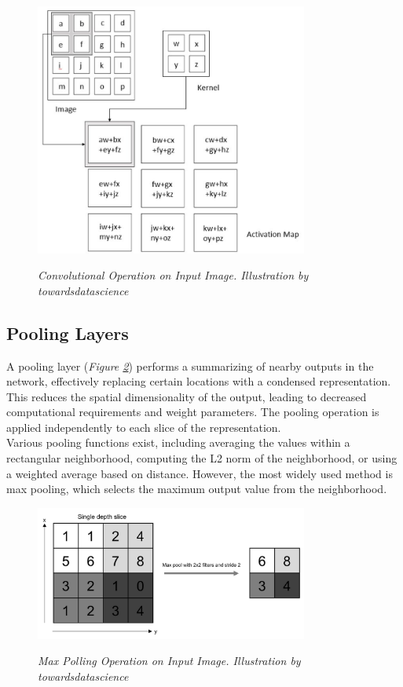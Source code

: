 \begin{figure}[H]
\centering
\includegraphics[width=0.8\textwidth]{imatges/preliminaries/convolutional-layer.png}
\caption[Convolutional Operation on Input Image]{\textit{Convolutional Operation on Input Image. Illustration by towardsdatascience}}
{\label{fig:convolutional-layer}}
\end{figure}


\subsection{Pooling Layers}

A pooling layer (\textit{Figure \ref{fig:pooling-layer}}) performs a summarizing of nearby outputs in the network, effectively replacing certain locations with a condensed representation. This reduces the spatial dimensionality of the output, leading to decreased computational requirements and weight parameters. The pooling operation is applied independently to each slice of the representation. \\

Various pooling functions exist, including averaging the values within a rectangular neighborhood, computing the L2 norm of the neighborhood, or using a weighted average based on distance. However, the most widely used method is max pooling, which selects the maximum output value from the neighborhood.

\newpage

\begin{figure}[H]
\centering
\includegraphics[width=0.8\textwidth]{imatges/preliminaries/polling-layer.png}
\caption[Max Polling Operation on Input Image]{\textit{Max Polling Operation on Input Image. Illustration by towardsdatascience}}
{\label{fig:pooling-layer}}
\end{figure}

